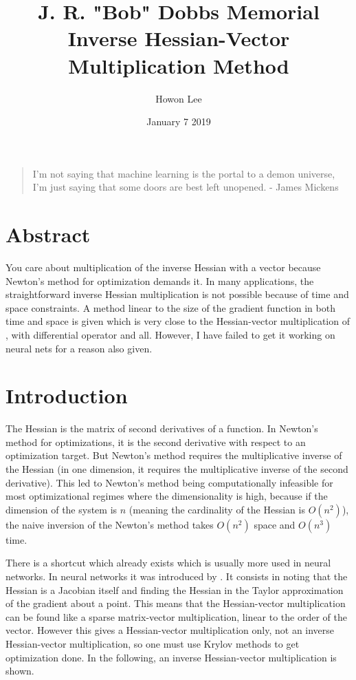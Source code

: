 \documentclass{article}
\begin{document}
\title{J. R. "Bob" Dobbs Memorial Inverse Hessian-Vector Multiplication Method}
\author{Howon Lee}
\date{January 7 2019}
\maketitle

\begin{quote}
I'm not saying that machine learning is the portal to a demon universe, I'm just saying that some doors are best left unopened. - James Mickens
\end{quote}

\section{Abstract}
You care about multiplication of the inverse Hessian with a vector because Newton's method for optimization demands it. In many applications, the straightforward inverse Hessian multiplication is not possible because of time and space constraints. A method linear to the size of the gradient function in both time and space is given which is very close to the Hessian-vector multiplication of \cite{pearlmutter1994}, with differential operator and all. However, I have failed to get it working on neural nets for a reason also given.

\section{Introduction}

The Hessian is the matrix of second derivatives of a function. In Newton's method for optimizations, it is the second derivative with respect to an optimization target. But Newton's method requires the multiplicative inverse of the Hessian (in one dimension, it requires the multiplicative inverse of the second derivative). This led to Newton's method being computationally infeasible for most optimizational regimes where the dimensionality is high, because if the dimension of the system is $n$ (meaning the cardinality of the Hessian is $O(n^2)$), the naive inversion of the Newton's method takes $O(n^2)$ space and $O(n^3)$ time.

There is a shortcut which already exists which is usually more used in neural networks. In neural networks it was introduced by \cite{pearlmutter1994}. It consists in noting that the Hessian is a Jacobian itself and finding the Hessian in the Taylor approximation of the gradient about a point. This means that the Hessian-vector multiplication can be found like a sparse matrix-vector multiplication, linear to the order of the vector. However this gives a Hessian-vector multiplication only, not an inverse Hessian-vector multiplication, so one must use Krylov methods to get optimization done\cite{martens2010}. In the following, an inverse Hessian-vector multiplication is shown.
\end{document}
